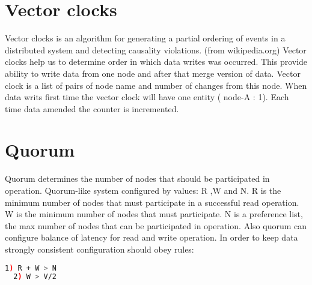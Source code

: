 \section*{Vector clocks}

Vector clocks is an algorithm for generating a partial ordering of events in a distributed system and detecting causality violations. (from wikipedia.org)
Vector clocks help us to determine order in which data writes was occurred. This provide ability to write data from one node and after that 
merge version of data. Vector clock is a list of pairs of node name and number of changes from this node.
When data writs first time the vector clock will have one entity ( node-A : 1). Each time data amended the counter is incremented.

\section*{Quorum}

Quorum determines the number of nodes that should be participated in operation. Quorum-like system configured by values: R ,W and N. R is the
minimum number of nodes that must participate in a successful read operation. W is the minimum number of nodes that must participate.
N is a preference list, the max number of nodes that can be participated in operation. Also quorum can configure balance of latency
for read and write operation.
 In order to keep data strongly consistent configuration should obey rules:
 \begin{lstlisting}[language=bash]
  1) R + W > N
  2) W > V/2
 \end{lstlisting}



